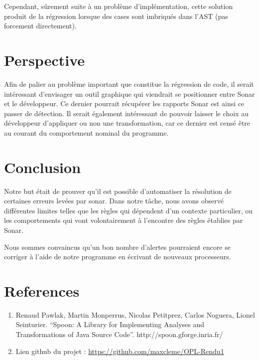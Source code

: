 \documentclass[a4paper]{article}
\begin{document}
\par
Cependant, sûrement suite à un problème d'implémentation, cette solution produit de la régression lorsque des cases sont imbriqués dans l'AST (pas forcement directement).

\section{Perspective}
\par Afin de palier au problème important que constitue la régression de code, il serait intéressant d'envisager un outil graphique qui viendrait se positionner entre Sonar et le développeur. Ce dernier pourrait récupérer les rapports Sonar est ainsi ce passer de détection. Il serait également intéressant de pouvoir laisser le choix au développeur d'appliquer ou non une transformation, car ce dernier est censé être au courant du comportement nominal du programme.

\section{Conclusion}
\par Notre but était de prouver qu'il est possible d'automatiser la résolution de certaines erreurs levées par sonar. Dans notre tâche, nous avons observé différentes limites telles que les règles qui dépendent d'un contexte particulier, ou les comportements qui vont volontairement à l'encontre des règles établies par Sonar.
\par Nous sommes convaincus qu'un bon nombre d'alertes pourraient encore se corriger à l'aide de notre programme en écrivant de nouveaux processeurs.


\section{References}
\begin{enumerate}
	\item  Renaud Pawlak, Martin Monperrus, Nicolas Petitprez, Carlos Noguera, Lionel Seinturier. “Spoon: A Library for Implementing Analyses and Transformations of Java Source Code”. http://spoon.gforge.inria.fr/
	\item Lien github du projet : \url{https://github.com/maxcleme/OPL-Rendu1}
\end{enumerate}	
\end{document}
